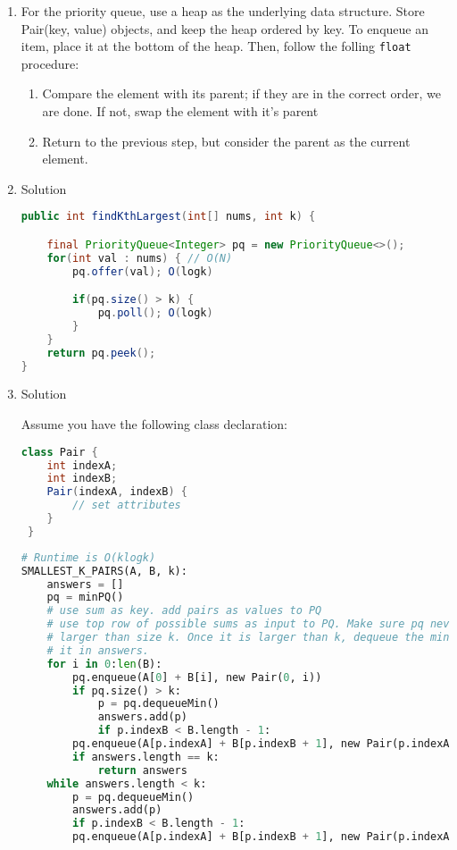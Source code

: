 \documentclass{article}
\begin{document}
\begin{enumerate}
		
	\item For the priority queue, use a heap as the underlying data structure. Store Pair(key, value) objects, and keep the heap ordered by key. To enqueue an item, place it at the bottom of the heap. Then, follow the folling \texttt{float} procedure:
	      	      
	      \begin{enumerate}
	      	\item Compare the element with its parent; if they are in the correct order, we are done. If not, swap the element with it's parent
	      	\item Return to the previous step, but consider the parent as the current element.
	      \end{enumerate}
	\item Solution
	      \begin{lstlisting}[language=Java]
public int findKthLargest(int[] nums, int k) {

    final PriorityQueue<Integer> pq = new PriorityQueue<>();
    for(int val : nums) { // O(N)
        pq.offer(val); O(logk)

        if(pq.size() > k) {
            pq.poll(); O(logk)
        }
    }
    return pq.peek();
}

	      \end{lstlisting}

	\item Solution

	Assume you have the following class declaration:

	      \begin{lstlisting}[language=Java]
class Pair {
    int indexA;
    int indexB;
    Pair(indexA, indexB) {
        // set attributes
    }
 }
	      \end{lstlisting}
	      \begin{lstlisting}[language=python]
# Runtime is O(klogk)
SMALLEST_K_PAIRS(A, B, k):
    answers = []
    pq = minPQ()
    # use sum as key. add pairs as values to PQ
    # use top row of possible sums as input to PQ. Make sure pq never grows
    # larger than size k. Once it is larger than k, dequeue the min and place
    # it in answers.
    for i in 0:len(B):
        pq.enqueue(A[0] + B[i], new Pair(0, i))
        if pq.size() > k:
            p = pq.dequeueMin()
            answers.add(p)
            if p.indexB < B.length - 1:
		pq.enqueue(A[p.indexA] + B[p.indexB + 1], new Pair(p.indexA, p.indexB + 1))
        if answers.length == k:
            return answers
    while answers.length < k:
        p = pq.dequeueMin()
        answers.add(p)
        if p.indexB < B.length - 1:
	    pq.enqueue(A[p.indexA] + B[p.indexB + 1], new Pair(p.indexA, p.indexB + 1))


\end{lstlisting}
\end{enumerate}
\end{document}
